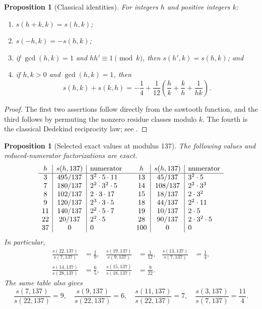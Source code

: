 \documentclass[11pt]{article}
\newtheorem{proposition}[theorem]{Proposition}
\theoremstyle{definition}
\theoremstyle{remark}
\begin{document}
\begin{proposition}[Classical identities]\label{prop:dedekind-identities}
For integers $h$ and positive integers $k$:
\begin{enumerate}
  \item $s(h+k,k)=s(h,k)$;
  \item $s(-h,k)=-s(h,k)$;
  \item if $\gcd(h,k)=1$ and $hh'\equiv1\pmod{k}$, then
        $s(h',k)=s(h,k)$; and
  \item if $h,k>0$ and $\gcd(h,k)=1$, then
  \begin{equation}\label{eq:dedekind-reciprocity}
    s(h,k)+s(k,h)
    =-\frac14+\frac1{12}\left(\frac hk+\frac kh+\frac1{hk}\right).
  \end{equation}
\end{enumerate}
\end{proposition}

\begin{proof}
The first two assertions follow directly from the sawtooth function, and the
third follows by permuting the nonzero residue classes modulo $k$.  The fourth
is the classical Dedekind reciprocity law; see
\cite[Chapter~2]{RademacherGrosswald1972}.
\end{proof}

\begin{proposition}[Selected exact values at modulus 137]
\label{cert:dedekind-values-137}
The following values and reduced-numerator factorizations are exact.
\[
\begin{array}{c|c|l@{\qquad}c|c|l}
h&s(h,137)&\text{numerator}&h&s(h,137)&\text{numerator}\\
\hline
3  &495/137&3^2\cdot5\cdot11 &13&45/137 &3^2\cdot5\\
7  &180/137&2^2\cdot3^2\cdot5&14&108/137&2^2\cdot3^3\\
8  &102/137&2\cdot3\cdot17   &15&18/137 &2\cdot3^2\\
9  &120/137&2^3\cdot3\cdot5 &18&44/137 &2^2\cdot11\\
11 &140/137&2^2\cdot5\cdot7 &19&10/137 &2\cdot5\\
22 &20/137 &2^2\cdot5        &28&90/137 &2\cdot3^2\cdot5\\
37 &0      &0                 &100&0     &0
\end{array}
\]
In particular,
\begin{align}
  \frac{s(22,137)}{s(7,137)}&=\frac19,&
  \frac{s(19,137)}{s(9,137)}&=\frac1{12},&
  \frac{s(13,137)}{s(7,137)}&=\frac14,\label{eq:dedekind-five-ratios-a}\\
  \frac{s(14,137)}{s(28,137)}&=\frac65,&
  \frac{s(15,137)}{s(18,137)}&=\frac9{22}.\label{eq:dedekind-five-ratios-b}
\end{align}
The same table also gives
\[
  \frac{s(7,137)}{s(22,137)}=9,
  \quad \frac{s(9,137)}{s(22,137)}=6,
  \quad \frac{s(11,137)}{s(22,137)}=7,
  \quad \frac{s(3,137)}{s(7,137)}=\frac{11}{4}.
\]
\end{proposition}
\end{document}
